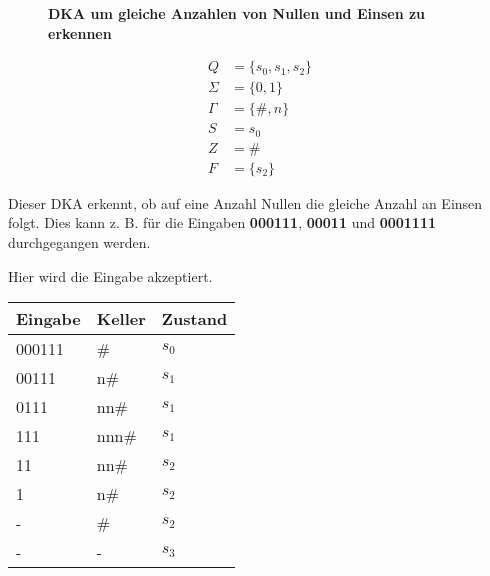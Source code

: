 \begin{figure}[h]
    \centering
    \caption*{\textbf{DKA um gleiche Anzahlen von Nullen und Einsen zu erkennen}}
\end{figure}

\Large
\begin{align*}
    Q & = \{s_0, s_1, s_2\} \\
    \Sigma & = \{0, 1\} \\
    \Gamma & = \{\#, n\} \\
    S & = s_0 \\
    Z & = \# \\
    F & = \{s_2\}
\end{align*}
\normalsize

Dieser DKA erkennt, ob auf eine Anzahl Nullen die gleiche Anzahl an Einsen folgt.
Dies kann z. B. für die Eingaben \textbf{000111}, \textbf{00011} und \textbf{0001111}
durchgegangen werden.

\clearpage

Hier wird die Eingabe akzeptiert.

\begin{table}[h]
    \begin{tabular}{|l|l|l|}
    \hline
    Eingabe & Keller & Zustand \\ \hline
    000111 & \# & $s_0$ \\ \hline
    00111 & n\# & $s_1$ \\ \hline
    0111 & nn\# & $s_1$ \\ \hline
    111 & nnn\# & $s_1$ \\ \hline
    11 & nn\# & $s_2$ \\ \hline
    1 & n\# & $s_2$ \\ \hline
    - & \# & $s_2$ \\ \hline
    - & - & $s_3$ \\ \hline
    \end{tabular}
\end{table}

